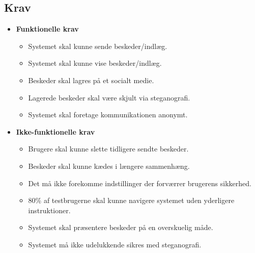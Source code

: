 \subsection{Krav}
\begin{itemize}
    \item \textbf{Funktionelle krav}
    \begin{itemize}
        \item Systemet skal kunne sende beskeder/indlæg.
        \item Systemet skal kunne vise beskeder/indlæg.
        \item Beskeder skal lagres på et socialt medie.
        \item Lagerede beskeder skal være skjult via steganografi.
        \item Systemet skal foretage kommunikationen anonymt.
    \end{itemize}
    \item \textbf{Ikke-funktionelle krav}
    \begin{itemize}
        \item Brugere skal kunne slette tidligere sendte beskeder.
        \item Beskeder skal kunne kædes i længere sammenhæng.
        \item Det må ikke forekomme indstillinger der forværrer brugerens sikkerhed.
        \item 80\% af testbrugerne skal kunne navigere systemet uden yderligere instruktioner.
        \item Systemet skal præsentere beskeder på en overskuelig måde.
        \item Systemet må ikke udelukkende sikres med steganografi.
    \end{itemize}  
\end{itemize}

